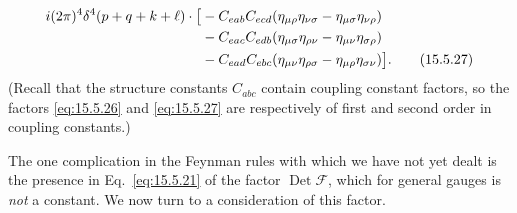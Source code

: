 \begin{align}
  i(2\pi)^4\delta^4(p+q+k+\ell)\mathbin{\cdot}
  \bigl[{}&-C_{eab}C_{ecd}
  (\eta_{\mu\rho}\eta_{\nu\sigma}-\eta_{\mu\sigma}\eta_{\nu\rho})
  \notag\\
  &-C_{eac}C_{edb}
  (\eta_{\mu\sigma}\eta_{\rho\nu}-\eta_{\mu\nu}\eta_{\sigma\rho})
  \notag\\
  &-C_{ead}C_{ebc}
  (\eta_{\mu\nu}\eta_{\rho\sigma}-\eta_{\mu\rho}\eta_{\sigma\nu})\bigr].
  \tag{15.5.27}\label{eq:15.5.27}
\end{align}
(Recall that the structure constants $C_{abc}$ contain coupling
constant factors, so the factors \eqref{eq:15.5.26} and \eqref{eq:15.5.27} are
respectively of first and second order in coupling constants.)

The one complication in the Feynman rules with which we have not yet dealt is
the presence in Eq.~\eqref{eq:15.5.21} of the factor
$\operatorname{Det}\mathcal F$, which for general gauges is \emph{not} a
constant. We now turn to a consideration of this factor.
